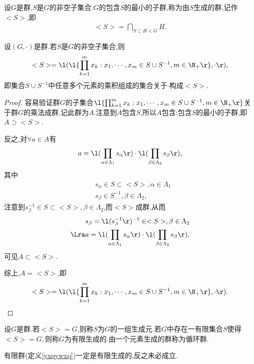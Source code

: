 \begin{definition}[由$S$生成的群]
    设$G$是群,$S$是$G$的非空子集合.$G$的包含$S$的最小的子群,称为由$S$生成的群,记作$<S>$,即\begin{align*}
        <S>=\bigcap_{S\subset H<G}H.
    \end{align*}
\end{definition}
\begin{proposition}
    设$(G,\cdot)$是群.若$S$是$G$的非空子集合,则\begin{align*}
        <S>=\l(\l\{\prod_{k=1}^{m}x_k:x_1,\cdots,x_m\in S\cup S^{-1},m\in\N_+\r\},\cdot\r),
    \end{align*}即集合$S\cup S^{-1}$中任意多个元素的乘积组成的集合关于$\cdot$构成$<S>$.
\end{proposition}
\begin{proof}
    容易验证群$G$的子集合$\l\{\prod_{k=1}^{m}x_k:x_1,\cdots,x_m\in S\cup S^{-1},m\in\N_+\r\}$关于群$G$的乘法成群,记此群为$A$.注意到$A$包含$S$,所以$A$包含:包含$S$的最小的子群,即$A\supset<S>$.

    反之,对$\forall a\in A$有\begin{align*}
        a=\l(\prod_{\alpha\in\Lambda_1}s_\alpha\r)\cdot\l(\prod_{\beta\in\Lambda_2}s_\beta\r),
    \end{align*}其中\begin{align*}
        &s_\alpha\in S\subset<S>,\alpha\in\Lambda_1\\
        &s_\beta\in S^{-1},\beta\in\Lambda_2,
    \end{align*}注意到$s_\beta^{-1}\in S\subset<S>,\beta\in\Lambda_2$,而$<S>$成群,从而\begin{align*}
        &s_\beta=\l(s_\beta^{-1}\r)^{-1}\in<S>,\beta\in\Lambda_2\\
        \Lra&a=\l(\prod_{\alpha\in\Lambda_1}s_\alpha\r)\cdot\l(\prod_{\beta\in\Lambda_2}s_\beta\r),
    \end{align*}可见$A\subset<S>$.

    综上,$A=<S>$,即\begin{align*}
        <S>=\l(\l\{\prod_{k=1}^{m}x_k:x_1,\cdots,x_m\in S\cup S^{-1},m\in\N_+\r\},\cdot\r).
    \end{align*}
\end{proof}
\begin{definition}\label{huasdjnkv}
    设$G$是群.若$<S>=G$,则称$S$为$G$的一组生成元.若$G$中存在一有限集合$S$使得$<S>=G,$则称$G$为有限生成的.由一个元素生成的群称为循环群.
\end{definition}
\begin{proposition}
    有限群(定义\ref{yxqywxq})一定是有限生成的,反之未必成立.
\end{proposition}
